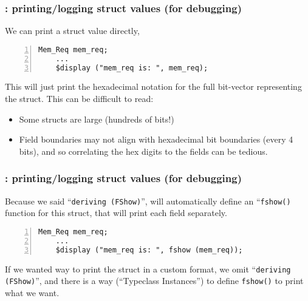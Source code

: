 \begin{frame}[fragile]
\frametitle{{\BSV}: printing/logging struct values (for debugging)}

\footnotesize

We can print a struct value directly, {\eg}

\begin{Verbatim}[frame=single, numbers=left]
    Mem_Req mem_req;
    ...
    $display ("mem_req is: ", mem_req);
\end{Verbatim}

\vspace{5ex}

This will just print the hexadecimal notation for the full bit-vector
representing the struct.  This can be difficult to read:

\begin{itemize}
 \item Some structs are large (hundreds of bits!)

 \item Field boundaries may not align with hexadecimal bit boundaries
       (every 4 bits), and so correlating the hex digits to the fields
       can be tedious.
\end{itemize}

\end{frame}


\begin{frame}[fragile]
\frametitle{{\BSV}: printing/logging struct values (for debugging)}

\footnotesize

Because we said ``{\tt deriving (FShow)}'', {\bsc} will automatically
define an ``{\tt fshow()} function for this struct, that will print
each field separately.

\vspace{2ex}

\begin{Verbatim}[frame=single, numbers=left]
    Mem_Req mem_req;
    ...
    $display ("mem_req is: ", fshow (mem_req));
\end{Verbatim}

\PAUSE{\vspace{5ex}}

If we wanted way to print the struct in a custom format, we omit
``{\tt deriving (FShow)}'', and there is a way (``Typeclass
Instances'') to define {\tt fshow()} to print what we want.

\end{frame}

